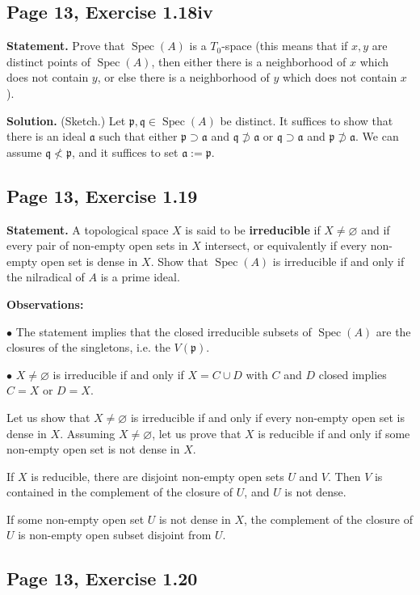 \documentclass[parskip=half,fontsize=12pt]{scrartcl}%
\newcommand{\mf}{\mathfrak}
\newcommand{\aaa}{\mf a}
\newcommand{\ppp}{\mf p}
\newcommand{\qqq}{\mf q}
\newcommand{\bu}{\bullet}
\newcommand{\Spec}{\operatorname{Spec}}\newcommand{\Sp}{\operatorname{Spec}}
\begin{document}
\subsection{Page 13, Exercise 1.18iv}%

\textbf{Statement.} Prove that $\Spec(A)$ is a $T_0$-space (this means that if $x,y$ are distinct points of $\Spec(A)$, then either there is a neighborhood of $x$ which does not contain $y$, or else there is a neighborhood of $y$ which does not contain $x$).

\textbf{Solution.} (Sketch.) Let $\ppp,\qqq\in\Spec(A)$ be distinct. It suffices to show that there is an ideal $\aaa$ such that either $\ppp\supset\aaa$ and $\qqq\not\supset\aaa$ or $\qqq\supset\aaa$ and $\ppp\not\supset\aaa$. We can assume $\qqq\not<\ppp$, and it suffices to set $\aaa:=\ppp$.

\subsection{Page 13, Exercise 1.19}\label{irr}%

\textbf{Statement.} A topological space $X$ is said to be \textbf{irreducible} if $X\ne\varnothing$ and if every pair of non-empty open sets in $X$ intersect, or equivalently if every non-empty open set is dense in $X$. Show that $\Spec(A)$ is irreducible if and only if the nilradical of $A$ is a prime ideal.

\textbf{Observations:}

$\bu$ The statement implies that the closed irreducible subsets of $\Spec(A)$ are the closures of the singletons, i.e. the $V(\ppp)$. 

$\bu$ $X\ne\varnothing$ is irreducible if and only if $X=C\cup D$ with $C$ and $D$ closed implies $C=X$ or $D=X$. 

Let us show that $X\ne\varnothing$ is irreducible if and only if every non-empty open set is dense in $X$. Assuming $X\ne\varnothing$, let us prove that $X$ is reducible if and only if some non-empty open set is not dense in $X$. 

If $X$ is reducible, there are disjoint non-empty open sets $U$ and $V$. Then $V$ is contained in the complement of the closure of $U$, and $U$ is not dense. 

If some non-empty open set $U$ is not dense in $X$, the complement of the closure of $U$ is non-empty open subset disjoint from $U$.

\subsection{Page 13, Exercise 1.20}%
\end{document}
